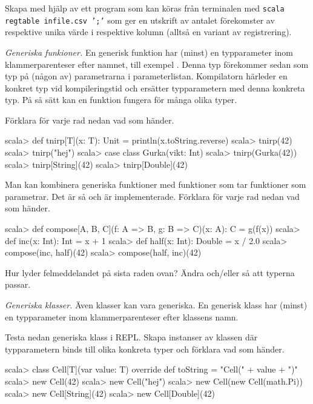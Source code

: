 \Subtask Skapa med hjälp av  ett program som kan köras från terminalen med \texttt{scala regtable infile.csv ';'} som ger en utskrift av antalet förekomster av respektive unika värde i respektive kolumn (alltså en variant av registrering).


\Task \emph{Generiska funkioner.} En generisk funktion har (minst) en typparameter inom klammerparenteser efter namnet, till exempel \code{[T]}. Denna typ förekommer sedan som typ på (någon av) parametrarna i parameterlistan. Kompilatorn härleder en konkret typ vid kompileringstid och ersätter typparametern med denna konkreta typ. På så sätt kan en funktion fungera för många olika typer. 

\Subtask Förklara för varje rad nedan vad som händer.

\begin{REPL}
scala> def tnirp[T](x: T): Unit = println(x.toString.reverse)
scala> tnirp(42)
scala> tnirp("hej")
scala> case class Gurka(vikt: Int)
scala> tnirp(Gurka(42))
scala> tnirp[String](42)
scala> tnirp[Double](42)
\end{REPL}

\Subtask Man kan kombinera generiska funktioner med funktioner som tar funktioner som parametrar. Det är så  och  är implementerade. Förklara för varje rad nedan vad som händer.

\begin{REPL}
scala> def compose[A, B, C](f: A => B, g: B => C)(x: A): C = g(f(x))
scala> def inc(x: Int): Int = x + 1
scala> def half(x: Int): Double = x / 2.0
scala> compose(inc, half)(42)
scala> compose(half, inc)(42)
\end{REPL}

\Subtask Hur lyder felmeddelandet på sista raden ovan? Ändra  och/eller  så att typerna passar.


\Task \emph{Generiska klasser.} Även klasser kan vara generiska. En generisk klass har (minst) en typparameter inom klammerparenteser efter klassens namn. 

\Subtask Testa nedan generiska klass  i REPL. Skapa instanser av klassen  där typparametern  binds till olika konkreta typer och förklara vad som händer.

\begin{REPL}
scala> class Cell[T](var value: T){
         override def toString = "Cell(" + value + ")"
       }
scala> new Cell(42)
scala> new Cell("hej")
scala> new Cell(new Cell(math.Pi))
scala> new Cell[String](42)
scala> new Cell[Double](42)
\end{REPL}

